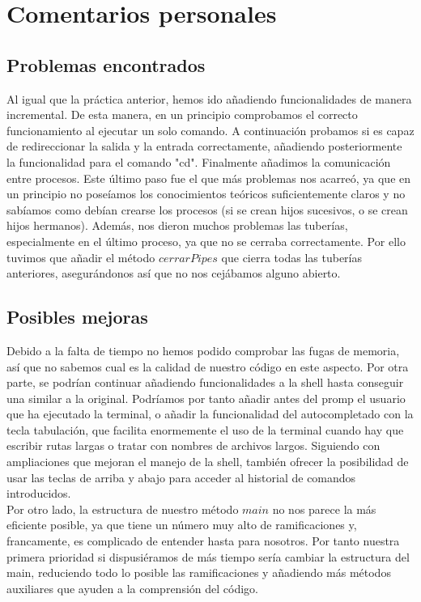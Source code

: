\chapter{Comentarios personales}
\section{Problemas encontrados}
Al igual que la práctica anterior, hemos ido añadiendo funcionalidades de manera incremental. De esta manera, en un principio comprobamos el correcto funcionamiento al ejecutar un solo comando. A continuación probamos si es capaz de redireccionar la salida y la entrada correctamente, añadiendo posteriormente la funcionalidad para el comando "cd". Finalmente añadimos la comunicación entre procesos. Este último paso fue el que más problemas nos acarreó, ya que en un principio no poseíamos los conocimientos teóricos suficientemente claros y no sabíamos como debían crearse los procesos (si se crean hijos sucesivos, o se crean hijos hermanos). Además, nos dieron muchos problemas las tuberías, especialmente en el último proceso, ya que no se cerraba correctamente. Por ello tuvimos que añadir el método $cerrarPipes$ que cierra todas las tuberías anteriores, asegurándonos así que no nos cejábamos alguno abierto.
\section{Posibles mejoras}
Debido a la falta de tiempo no hemos podido comprobar las fugas de memoria, así que no sabemos cual es la calidad de nuestro código en este aspecto. Por otra parte, se podrían continuar añadiendo funcionalidades a la shell hasta conseguir una similar a la original. Podríamos por tanto añadir antes del promp el usuario que ha ejecutado la terminal, o añadir la funcionalidad del autocompletado con la tecla tabulación, que facilita enormemente el uso de la terminal cuando hay que escribir rutas largas o tratar con nombres de archivos largos. Siguiendo con ampliaciones que mejoran el manejo de la shell, también ofrecer la posibilidad de usar las teclas de arriba y abajo para acceder al historial de comandos introducidos.\\
Por otro lado, la estructura de nuestro método $main$ no nos parece la más eficiente posible, ya que tiene un número muy alto de ramificaciones y, francamente, es complicado de entender hasta para nosotros. Por tanto nuestra primera prioridad si dispusiéramos de más tiempo sería cambiar la estructura del main, reduciendo todo lo posible las ramificaciones y añadiendo más métodos auxiliares que ayuden a la comprensión del código. 